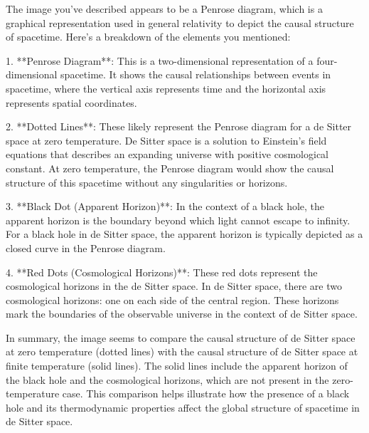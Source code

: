 The image you've described appears to be a Penrose diagram, which is a graphical representation used in general relativity to depict the causal structure of spacetime. Here's a breakdown of the elements you mentioned:

1. **Penrose Diagram**: This is a two-dimensional representation of a four-dimensional spacetime. It shows the causal relationships between events in spacetime, where the vertical axis represents time and the horizontal axis represents spatial coordinates.

2. **Dotted Lines**: These likely represent the Penrose diagram for a de Sitter space at zero temperature. De Sitter space is a solution to Einstein's field equations that describes an expanding universe with positive cosmological constant. At zero temperature, the Penrose diagram would show the causal structure of this spacetime without any singularities or horizons.

3. **Black Dot (Apparent Horizon)**: In the context of a black hole, the apparent horizon is the boundary beyond which light cannot escape to infinity. For a black hole in de Sitter space, the apparent horizon is typically depicted as a closed curve in the Penrose diagram.

4. **Red Dots (Cosmological Horizons)**: These red dots represent the cosmological horizons in the de Sitter space. In de Sitter space, there are two cosmological horizons: one on each side of the central region. These horizons mark the boundaries of the observable universe in the context of de Sitter space.

In summary, the image seems to compare the causal structure of de Sitter space at zero temperature (dotted lines) with the causal structure of de Sitter space at finite temperature (solid lines). The solid lines include the apparent horizon of the black hole and the cosmological horizons, which are not present in the zero-temperature case. This comparison helps illustrate how the presence of a black hole and its thermodynamic properties affect the global structure of spacetime in de Sitter space.